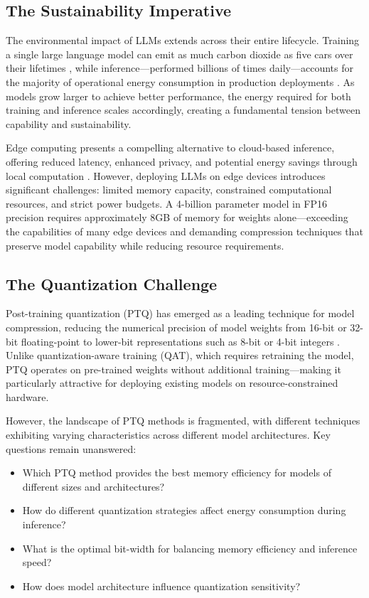 \documentclass[11pt,a4paper]{article}
\begin{document}
\subsection{The Sustainability Imperative}

The environmental impact of LLMs extends across their entire lifecycle. Training a single large language model can emit as much carbon dioxide as five cars over their lifetimes \cite{strubell2019energy}, while inference—performed billions of times daily—accounts for the majority of operational energy consumption in production deployments \cite{patterson2021carbon}. As models grow larger to achieve better performance, the energy required for both training and inference scales accordingly, creating a fundamental tension between capability and sustainability.

Edge computing presents a compelling alternative to cloud-based inference, offering reduced latency, enhanced privacy, and potential energy savings through local computation \cite{shi2016edge}. However, deploying LLMs on edge devices introduces significant challenges: limited memory capacity, constrained computational resources, and strict power budgets. A 4-billion parameter model in FP16 precision requires approximately 8GB of memory for weights alone—exceeding the capabilities of many edge devices and demanding compression techniques that preserve model capability while reducing resource requirements.

\subsection{The Quantization Challenge}

Post-training quantization (PTQ) has emerged as a leading technique for model compression, reducing the numerical precision of model weights from 16-bit or 32-bit floating-point to lower-bit representations such as 8-bit or 4-bit integers \cite{han2015deep}. Unlike quantization-aware training (QAT), which requires retraining the model, PTQ operates on pre-trained weights without additional training—making it particularly attractive for deploying existing models on resource-constrained hardware.

However, the landscape of PTQ methods is fragmented, with different techniques exhibiting varying characteristics across different model architectures. Key questions remain unanswered:

\begin{itemize}[leftmargin=*,nosep]
    \item Which PTQ method provides the best memory efficiency for models of different sizes and architectures?
    \item How do different quantization strategies affect energy consumption during inference?
    \item What is the optimal bit-width for balancing memory efficiency and inference speed?
    \item How does model architecture influence quantization sensitivity?
\end{itemize}
\end{document}
